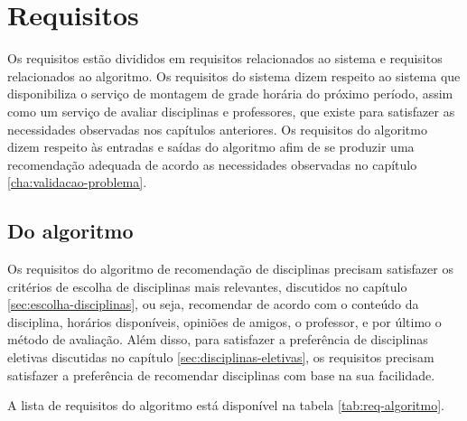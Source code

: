 
\chapter{Requisitos}
\label{cha:Requisitos}

Os requisitos estão divididos em requisitos relacionados ao sistema e requisitos relacionados ao algoritmo.
Os requisitos do sistema dizem respeito ao sistema que disponibiliza o serviço de montagem de grade horária do próximo período, assim como um serviço de avaliar disciplinas e professores, que existe para satisfazer as necessidades observadas nos capítulos anteriores. Os requisitos do algoritmo dizem respeito às entradas e saídas do algoritmo afim de se produzir uma recomendação adequada de acordo as necessidades observadas no capítulo \ref{cha:validacao-problema}.

\section{Do algoritmo}

Os requisitos do algoritmo de recomendação de disciplinas precisam satisfazer os critérios de escolha de disciplinas mais relevantes, discutidos no capítulo \ref{sec:escolha-disciplinas}, ou seja, recomendar de acordo com o conteúdo da disciplina, horários disponíveis, opiniões de amigos, o professor, e por último o método de avaliação.
Além disso, para satisfazer a preferência de disciplinas eletivas discutidas no capítulo \ref{sec:disciplinas-eletivas}, os requisitos precisam satisfazer a preferência de recomendar disciplinas com base na sua facilidade.

A lista de requisitos do algoritmo está disponível na tabela \ref{tab:req-algoritmo}.

